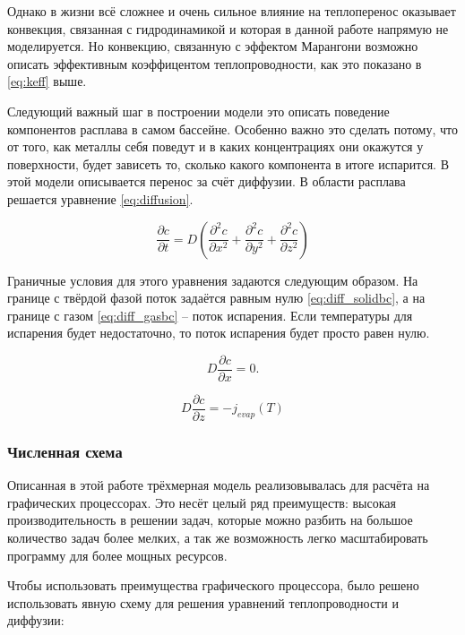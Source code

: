 Однако в жизни всё сложнее и очень сильное влияние на теплоперенос оказывает конвекция, связанная с гидродинамикой и которая в данной работе напрямую не моделируется. Но конвекцию, связанную с эффектом Марангони возможно описать эффективным коэффицентом теплопроводности, как это показано в \ref{eq:keff} выше. 

Следующий важный шаг в построении модели это описать поведение компонентов расплава в самом бассейне. Особенно важно это сделать потому, что от того, как металлы себя поведут и в каких концентрациях они окажутся у поверхности, будет зависеть то, сколько какого компонента в итоге испарится. В этой модели описывается перенос за счёт диффузии. В области расплава решается уравнение \ref{eq:diffusion}.

\begin{equation}
    \label{eq:diffusion}
    \frac{\partial c}{\partial t} = D\left(\frac{\partial^2 c}{\partial x^2} + \frac{\partial^2 c}{\partial y^2} + \frac{\partial^2 c}{\partial z^2}\right)
\end{equation}

Граничные условия для этого уравнения задаются следующим образом. На границе с твёрдой фазой поток задаётся равным нулю \ref{eq:diff_solidbc}, а на границе с газом \ref{eq:diff_gasbc} -- поток испарения. Если температуры для испарения будет недостаточно, то поток испарения будет просто равен нулю.

\begin{equation}
    \label{eq:diff_solidbc}
    D \frac{\partial c}{\partial x} = 0.
\end{equation}

\begin{equation}
    \label{eq:diff_gasbc}
    D \frac{\partial c}{\partial z} = -j_{evap}(T)
\end{equation}

\subsubsection{Численная схема}

Описанная в этой работе трёхмерная модель реализовывалась для расчёта на графических процессорах. Это несёт целый ряд преимуществ: высокая производительность в решении задач, которые можно разбить на большое количество задач более мелких, а так же возможность легко масштабировать программу для более мощных ресурсов.

Чтобы использовать преимущества графического процессора, было решено использовать явную схему для решения уравнений теплопроводности и диффузии:

